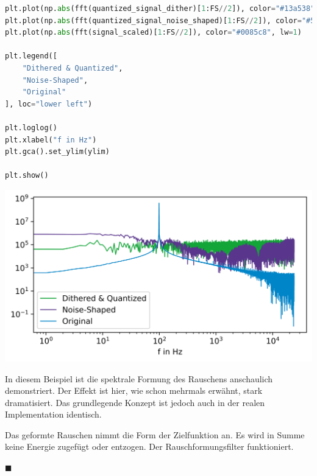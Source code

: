 \begin{lstlisting}[language=Python]
plt.plot(np.abs(fft(quantized_signal_dither)[1:FS//2]), color="#13a538", lw=1)
plt.plot(np.abs(fft(quantized_signal_noise_shaped)[1:FS//2]), color="#59358c", lw=1)
plt.plot(np.abs(fft(signal_scaled)[1:FS//2]), color="#0085c8", lw=1)

plt.legend([
    "Dithered & Quantized",
    "Noise-Shaped",
    "Original"
], loc="lower left")

plt.loglog()
plt.xlabel("f in Hz")
plt.gca().set_ylim(ylim)

plt.show()
\end{lstlisting}

\includegraphics{./img/dd90f155bf8c245aa3acbf7b017e8970bb7bdab9.png}

In diesem Beispiel ist die spektrale Formung des Rauschens anschaulich
demonstriert. Der Effekt ist hier, wie schon mehrmals erwähnt, stark
dramatisiert. Das grundlegende Konzept ist jedoch auch in der realen
Implementation identisch.

Das geformte Rauschen nimmt die Form der Zielfunktion an. Es wird in
Summe keine Energie zugefügt oder entzogen. Der Rauschformungsfilter
funktioniert.

\hfill\(\blacksquare\)
